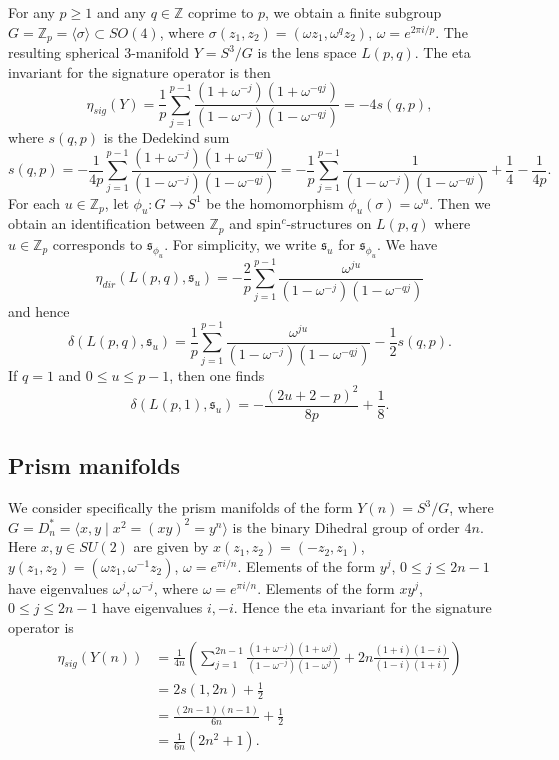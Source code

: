 \documentclass{amsart}
\theoremstyle{definition}
\theoremstyle{remark}
\numberwithin{equation}{section}
\begin{document}
For any $p \ge 1$ and any $q \in \mathbb{Z}$ coprime to $p$, we obtain a finite subgroup $G = \mathbb{Z}_p = \langle \sigma \rangle \subset SO(4)$, where $\sigma( z_1 , z_2 ) = ( \omega z_1 , \omega^q z_2)$, $\omega = e^{2 \pi i/p}$. The resulting spherical $3$-manifold $Y = S^3/G$ is the lens space $L(p,q)$. The eta invariant for the signature operator is then
\[
\eta_{sig}(Y) = \frac{1}{p} \sum_{j=1}^{p-1} \frac{(1+\omega^{-j})(1+\omega^{-qj})}{(1-\omega^{-j})(1-\omega^{-qj})} = -4 s(q,p),
\]
where $s(q,p)$ is the Dedekind sum
\[
s(q,p) = -\frac{1}{4p} \sum_{j=1}^{p-1} \frac{(1+\omega^{-j})(1+\omega^{-qj})}{(1-\omega^{-j})(1-\omega^{-qj})} = -\frac{1}{p} \sum_{j=1}^{p-1} \frac{1}{(1-\omega^{-j})(1-\omega^{-qj})} + \frac{1}{4} - \frac{1}{4p}.
\]
For each $u \in \mathbb{Z}_p$, let $\phi_u : G \to S^1$ be the homomorphism $\phi_u( \sigma ) = \omega^u$. Then we obtain an identification between $\mathbb{Z}_p$ and spin$^c$-structures on $L(p,q)$ where $u \in \mathbb{Z}_p$ corresponds to $\mathfrak{s}_{\phi_u}$. For simplicity, we write $\mathfrak{s}_u$ for $\mathfrak{s}_{\phi_u}$. We have
\[
\eta_{dir}( L(p,q) , \mathfrak{s}_u ) = -\frac{2}{p} \sum_{j=1}^{p-1} \frac{ \omega^{ju}}{(1-\omega^{-j})(1-\omega^{-qj})}
\]
and hence
\[
\delta( L(p,q) , \mathfrak{s}_u ) = \frac{1}{p} \sum_{j=1}^{p-1} \frac{ \omega^{ju} }{(1-\omega^{-j})(1-\omega^{-qj})} - \frac{1}{2} s(q,p).
\]
If $q=1$ and $0 \le u \le p-1$, then one finds
\[
\delta( L(p,1) , \mathfrak{s}_u) = - \frac{ (2u+2-p)^2 }{8p} + \frac{1}{8}.
\]

\subsection{Prism manifolds}\label{sec:prism}

We consider specifically the prism manifolds of the form $Y(n) = S^3/G$, where $G = D^*_n = \langle x , y \; | \;  x^2 = (xy)^2 = y^n \rangle$ is the binary Dihedral group of order $4n$. Here $x,y \in SU(2)$ are given by $x(z_1,z_2) = (-z_2 , z_1)$, $y(z_1,z_2) = (\omega z_1 , \omega^{-1} z_2)$, $\omega = e^{\pi i/n}$. Elements of the form $y^j$, $0 \le j \le 2n-1$ have eigenvalues $\omega^j , \omega^{-j}$, where $\omega = e^{\pi i /n}$. Elements of the form $x y^j$, $0 \le j \le 2n-1$ have eigenvalues $i,-i$. Hence the eta invariant for the signature operator is
\begin{align*}
\eta_{sig}( Y(n) ) &= \frac{1}{4n}\left( \sum_{j=1}^{2n-1} \frac{(1+\omega^{-j})(1+\omega^j)}{(1-\omega^{-j})(1-\omega^j)} + 2n \frac{(1+i)(1-i)}{(1-i)(1+i)} \right) \\
&= 2s(1,2n) + \frac{1}{2} \\
&= \frac{(2n-1)(n-1)}{6n} + \frac{1}{2} \\
&= \frac{1}{6n}(2n^2 +1).
\end{align*}
\end{document}

